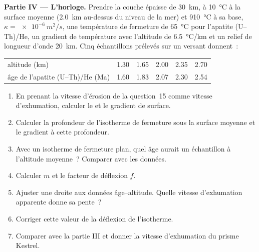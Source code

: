 \begin{problem}
\medskip\noindent\textbf{Partie IV --- L'horloge.}
Prendre la couche épaisse de \qty{30}{km}, à \qty{10}{\celsius} à la surface moyenne
(\qty{2.0}{km} au-dessus du niveau de la mer) et \qty{910}{\celsius} à sa base, $\kappa
= \qty{e-6}{m^2/s}$, une température de fermeture de \qty{65}{\celsius} pour l'apatite
(U--Th)/He, un gradient de température avec l'altitude de \qty{6.5}{\celsius/km} et un relief de
longueur d'onde \qty{20}{km}. Cinq échantillons prélevés sur un versant donnent~:
\begin{center}
\small
\begin{tabular}{lccccc}
\hline
altitude (\unit{km}) & 1.30 & 1.65 & 2.00 & 2.35 & 2.70 \\
âge de l'apatite (U--Th)/He (\unit{Ma}) & 1.60 & 1.83 & 2.07 & 2.30 & 2.54 \\
\hline
\end{tabular}
\end{center}
\begin{enumerate}[resume]
  \item En prenant la vitesse d'érosion de la question~15 comme vitesse d'exhumation, calculer
        le  et le gradient de surface.
  \item Calculer la profondeur de l'isotherme de fermeture sous la surface moyenne et
        le gradient à cette profondeur.
  \item Avec un isotherme de fermeture plan, quel âge aurait un échantillon à l'altitude
        moyenne~? Comparer avec les données.
  \item Calculer $m$ et le facteur de déflexion $f$.
  \item Ajuster une droite aux données âge--altitude. Quelle vitesse d'exhumation apparente
        donne sa pente~?
  \item Corriger cette valeur de la déflexion de l'isotherme.
  \item Comparer avec la partie III et donner la vitesse d'exhumation du
        prisme Kestrel.
\end{enumerate}
\end{problem}
